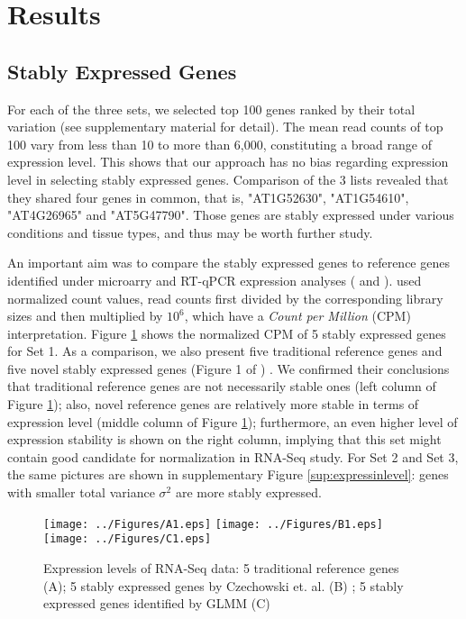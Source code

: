 \documentclass[11pt, a4paper]{article}
\begin{document}
 \section{Results}
 
 \subsection{Stably Expressed Genes}
  For each of the three sets, we selected top 100 genes ranked by their total variation (see supplementary material for detail). The mean read counts of top 100 vary from less than 10 to more than 6,000, constituting a broad range of expression level. This shows that our approach has no bias regarding expression level in selecting stably expressed genes. Comparison of the 3 lists revealed that they shared four genes in common, that is, "AT1G52630", "AT1G54610", "AT4G26965" and "AT5G47790".  Those genes are stably expressed under various conditions and tissue types, and thus may be worth further study. 

An important aim was to compare the stably expressed genes to reference genes identified under microarry and RT-qPCR expression analyses (\cite{czechowski2005genome} and \cite{dekkers2012identification}).\cite{anders2013count} used normalized count values, read counts first divided by the corresponding library sizes and then multiplied by $10^6$, which have a \textit{Count per Million} (CPM) interpretation.  Figure \ref{expressinlevel} shows the normalized CPM of 5 stably expressed genes for Set 1. As a comparison, we also present five traditional reference genes and five novel stably expressed genes (Figure 1 of \cite{czechowski2005genome}) . We confirmed their conclusions that traditional reference genes are not necessarily stable ones (left column of Figure \ref{expressinlevel}); also, novel reference genes are relatively more stable in terms of expression level (middle column of Figure \ref{expressinlevel}); furthermore, an even higher level of expression stability is shown on the right column, implying that this set might contain good candidate for normalization in RNA-Seq study. For Set 2 and Set 3, the same pictures are shown in supplementary Figure \ref{sup:expressinlevel}: genes with smaller total variance $\sigma^2$ are more stably expressed. 

 \begin{figure}[H]
\begin{center}
\texttt{[image: ../Figures/A1.eps]}
\texttt{[image: ../Figures/B1.eps]}
\texttt{[image: ../Figures/C1.eps]}
\caption{{\small{\label{expressinlevel} Expression levels  of RNA-Seq data: 5 traditional reference genes (A)};  5 stably expressed genes by Czechowski et. al. (B) ; 5 stably expressed genes identified by GLMM (C) }}
\end{center}
\end{figure} 
\end{document}
